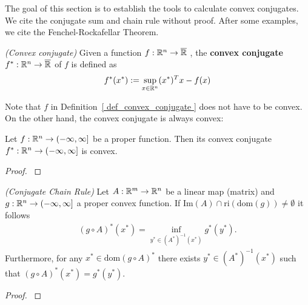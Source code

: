 The goal of this section is to establish the tools to calculate convex conjugates. 
We cite the conjugate sum and chain rule without proof.
After some examples, we cite the Fenchel-Rockafellar Theorem.
\begin{definition}
  \label{ def_convex_conjugate }
  \emph{(Convex conjugate)}
  Given a function
  $
    f:
    \mathbb{R}^n \to \overline{\mathbb{R}}
  $
  ,
  the 
  \textbf{convex conjugate}
  $
    f^*:
    \mathbb{R}^n \to \overline{\mathbb{R}}
  $
  of $f$ is defined as
  \begin{gather}
    f^*(x^*)
    :=
    \sup_{ x \in \mathbb{R}^n }
    (x^*)^T x - f(x)
  \end{gather}
\end{definition}

Note that $f$ in Definition~\ref{ def_convex_conjugate }
does not have to be convex. On the other hand, the convex conjugate is always convex:

\begin{proposition}
  Let  
  $
    f:
    \mathbb{R}^n \to ( - \infty, \infty ]
  $
  be a proper function. 
  Then its convex conjugate
  $
    f^*:
    \mathbb{R}^n \to ( - \infty, \infty ]
  $
  is convex.
\end{proposition}
\begin{proof}
  \cite[Proposition~4.2]{Mordukhovich2022}
\end{proof}


\begin{theorem}
  \emph{(Conjugate Chain Rule)}
  \label{cvxa_conjugate_chain_rule}
  Let 
  $
    A:
      \mathbb{R}^m \to \mathbb{R}^n
  $
  be a linear map (matrix)
  and
  $
    g:
      \mathbb{R}^n \to (-\infty, \infty]
  $
  a proper convex function. If
  $
    \text{Im}(A) \cap \text{ri}(\text{dom}(g))
    \neq
    \emptyset
  $
  it follows
  \begin{gather}
    ( g \circ A )^* ( x^* )
    =
    \inf_
          { y^* \in ( A^* )^{ -1 } ( x^* )}
                                          g^*( y^* )
                                          .
  \end{gather}
  Furthermore, 
    for any 
      $
        x^* \in \text{dom}( g \circ A)^*
      $
        there exists
          $
            y^* \in ( A^* )^{ -1 } ( x^* )
          $
            such that
              $
                ( g \circ A)^* ( x^* )
                =
                g^*( y^* )
              $.
\end{theorem}
\begin{proof}
  \cite[Proposition~4.28]{Mordukhovich2022}
\end{proof}

